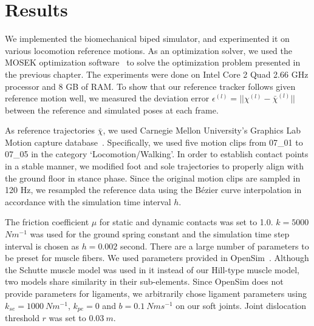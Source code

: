 \documentclass[master,english,final]{kaist-ucs}
\begin{document}
\chapter{Results}

We implemented the biomechanical biped simulator, and experimented
it on various locomotion reference motions.
As an optimization solver, we used the MOSEK optimization software~\cite{mosek} to solve
the optimization problem presented in the previous chapter.
The experiments were done on Intel Core 2 Quad 2.66 GHz processor and 8 GB of RAM.
To show that our reference tracker follows given reference motion well,
we measured the deviation error $\epsilon^{(l)}=||\chi^{(l)}-\bar{\chi}^{(l)}||$
between the reference and simulated poses at each frame.

As reference trajectories $\bar{\chi}$, we used Carnegie Mellon
University's Graphics Lab Motion capture database~\cite{cmumocap}.
Specifically, we used five motion clips from 07\_01 to 07\_05
in the category `Locomotion/Walking'.
In order to establish contact points in a stable manner,
we modified foot and sole trajectories to properly align with
the ground floor in stance phase.
Since the original motion clips are sampled in 120 Hz, we resampled
the reference data using the B\'{e}zier curve interpolation
in accordance with the simulation time interval $h$.

The friction coefficient $\mu$ for static and dynamic contacts was set to 1.0.
$k=5000$ $Nm^{-1}$ was used for the ground spring constant and
the simulation time step interval is chosen as $h=0.002$ second.
There are a large number of parameters to be preset for muscle fibers.
We used parameters provided in OpenSim~\cite{Delp07}.
Although the Schutte muscle model was used in it instead of our Hill-type muscle model,
two models share similarity in their sub-elements.
Since OpenSim does not provide parameters for ligaments, we arbitrarily
chose ligament parameters using $k_{se} = 1000~Nm^{-1}$, $k_{pe} = 0$ and $b=0.1~Nms^{-1}$
on our soft joints. Joint dislocation threshold $r$ was set to $0.03~m$.
\end{document}
